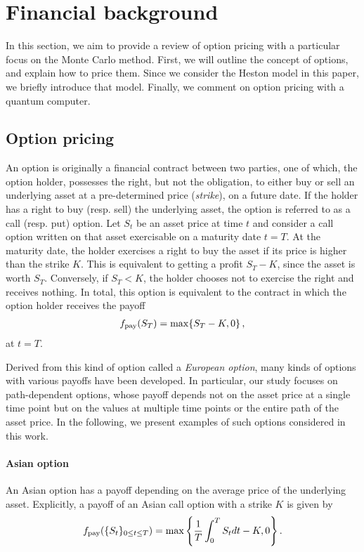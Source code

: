 {\section{Financial background}\label{sec:financial_backgrounds}
In this section, we aim to provide a review of option pricing with a particular focus on the Monte Carlo method.
First, we will outline the concept of options, and explain how to price them.
Since we consider the Heston model in this paper, we briefly introduce that model.
Finally, we comment on option pricing with a quantum computer.

\subsection{Option pricing}\label{sec:option}
An option is originally a financial contract between two parties, one of which, the option holder, possesses the right, but not the obligation, to either buy or sell an underlying asset at a pre-determined price ({\it strike}), on a future date.
If the holder has a right to buy (resp. sell) the underlying asset, the option is referred to as a call (resp. put) option.
Let $S_t$ be an asset price at time $t$ and consider a call option written on that asset exercisable on a maturity date $t=T$. 
At the maturity date, the holder exercises a right to buy the asset if its price is higher than the strike $K$.
This is equivalent to getting a profit $S_T - K$, since the asset is worth $S_T$.
Conversely, if $S_T<K$, the holder chooses not to exercise the right and receives nothing. 
In total, this option is equivalent to the contract in which the option holder receives the payoff
\begin{align}
    f_{\rm pay} (S_T) = \max\{S_T - K,0\} \, ,
\end{align}
at $t=T$.

Derived from this kind of option called a {\it European option}, many kinds of options with various payoffs have been developed.
In particular, our study focuses on path-dependent options, whose payoff depends not on the asset price at a single time point but on the values at multiple time points or the entire path of the asset price. 
In the following, we present examples of such options considered in this work.

\paragraph*{Asian option} An Asian option has a payoff depending on the average price of the underlying asset.
Explicitly, a payoff of an Asian call option with a strike $K$ is given by 
\begin{align}
    f_{\rm pay}(\{S_t\}_{0 \leq t \leq T}) = \max \left\{ \frac{1}{T}\int_0^T S_t dt - K,0 \right\}.
\end{align}

}
